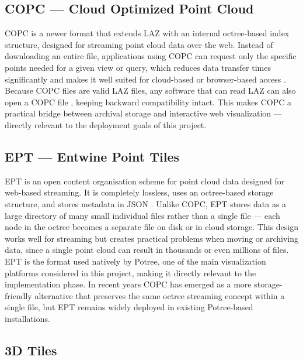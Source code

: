 \documentclass[]{report}
\begin{document}
\subsection{COPC --- Cloud Optimized Point Cloud}

COPC is a newer format that extends LAZ with an internal octree-based index structure,
designed for streaming point cloud data over the web. Instead of downloading an entire file,
applications using COPC can request only the specific points needed for a given view or query,
which reduces data transfer times significantly and makes it well suited for cloud-based or
browser-based access \cite{copc_spec}. Because COPC files are valid LAZ files, any software
that can read LAZ can also open a COPC file \cite{copc_spec}, keeping backward compatibility
intact. This makes COPC a practical bridge between archival storage and interactive web
visualization --- directly relevant to the deployment goals of this project.

\subsection{EPT --- Entwine Point Tiles}

EPT is an open content organisation scheme for point cloud data designed for web-based
streaming. It is completely lossless, uses an octree-based storage structure, and stores
metadata in JSON \cite{esco2022review}. Unlike COPC, EPT stores data as a large directory of
many small individual files rather than a single file — each node in the octree becomes a
separate file on disk or in cloud storage. This design works well for streaming but creates
practical problems when moving or archiving data, since a single point cloud can result in
thousands or even millions of files. EPT is the format used natively by Potree, one of the main
visualization platforms considered in this project, making it directly relevant to the
implementation phase. In recent years COPC has emerged as a more storage-friendly alternative
that preserves the same octree streaming concept within a single file, but EPT remains widely
deployed in existing Potree-based installations.

\subsection{3D Tiles}
\end{document}
